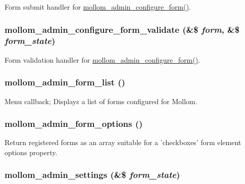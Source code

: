 Form submit handler for \hyperlink{mollom_8admin_8inc_ef4774c8636c4437de390854c58b5852}{mollom\_\-admin\_\-configure\_\-form()}. \hypertarget{mollom_8admin_8inc_b6ebbb0ffebf1763d6ade7261b365c70}{
\subsubsection[{mollom\_\-admin\_\-configure\_\-form\_\-validate}]{\setlength{\rightskip}{0pt plus 5cm}mollom\_\-admin\_\-configure\_\-form\_\-validate (\&\$ {\em form}, \/  \&\$ {\em form\_\-state})}}
\label{mollom_8admin_8inc_b6ebbb0ffebf1763d6ade7261b365c70}


Form validation handler for \hyperlink{mollom_8admin_8inc_ef4774c8636c4437de390854c58b5852}{mollom\_\-admin\_\-configure\_\-form()}. \hypertarget{mollom_8admin_8inc_d38f5b9fd66d34954455d8acebfdeb3e}{
\subsubsection[{mollom\_\-admin\_\-form\_\-list}]{\setlength{\rightskip}{0pt plus 5cm}mollom\_\-admin\_\-form\_\-list ()}}
\label{mollom_8admin_8inc_d38f5b9fd66d34954455d8acebfdeb3e}


Menu callback; Displays a list of forms configured for Mollom. \hypertarget{mollom_8admin_8inc_e52028518c58476934227c248c38614c}{
\subsubsection[{mollom\_\-admin\_\-form\_\-options}]{\setlength{\rightskip}{0pt plus 5cm}mollom\_\-admin\_\-form\_\-options ()}}
\label{mollom_8admin_8inc_e52028518c58476934227c248c38614c}


Return registered forms as an array suitable for a 'checkboxes' form element options property. \hypertarget{mollom_8admin_8inc_74016f613ad66fa23c8169ef90978694}{
\subsubsection[{mollom\_\-admin\_\-settings}]{\setlength{\rightskip}{0pt plus 5cm}mollom\_\-admin\_\-settings (\&\$ {\em form\_\-state})}}
\label{mollom_8admin_8inc_74016f613ad66fa23c8169ef90978694}



